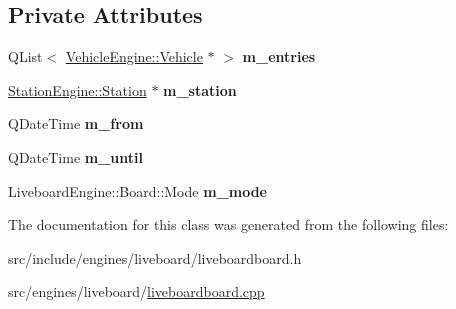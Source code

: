 \subsection*{Private Attributes}
\begin{DoxyCompactItemize}
\item 
\mbox{\label{classLiveboardEngine_1_1Board_a0f83c2dd26626f955927bffa92c5f5f5}} 
Q\+List$<$ \mbox{\hyperlink{classVehicleEngine_1_1Vehicle}{Vehicle\+Engine\+::\+Vehicle}} $\ast$ $>$ {\bfseries m\+\_\+entries}
\item 
\mbox{\label{classLiveboardEngine_1_1Board_a1ff93cd110c4d8afd23745500b384e38}} 
\mbox{\hyperlink{classStationEngine_1_1Station}{Station\+Engine\+::\+Station}} $\ast$ {\bfseries m\+\_\+station}
\item 
\mbox{\label{classLiveboardEngine_1_1Board_aab66196ab496ad45bd07e5652eb24eb2}} 
Q\+Date\+Time {\bfseries m\+\_\+from}
\item 
\mbox{\label{classLiveboardEngine_1_1Board_ad68f8d703d1a747b5cb0d8c12abc685d}} 
Q\+Date\+Time {\bfseries m\+\_\+until}
\item 
\mbox{\label{classLiveboardEngine_1_1Board_a1dde2228349f7f97ddd6191b1df07712}} 
Liveboard\+Engine\+::\+Board\+::\+Mode {\bfseries m\+\_\+mode}
\end{DoxyCompactItemize}


The documentation for this class was generated from the following files\+:\begin{DoxyCompactItemize}
\item 
src/include/engines/liveboard/liveboardboard.\+h\item 
src/engines/liveboard/\mbox{\hyperlink{liveboardboard_8cpp}{liveboardboard.\+cpp}}\end{DoxyCompactItemize}
